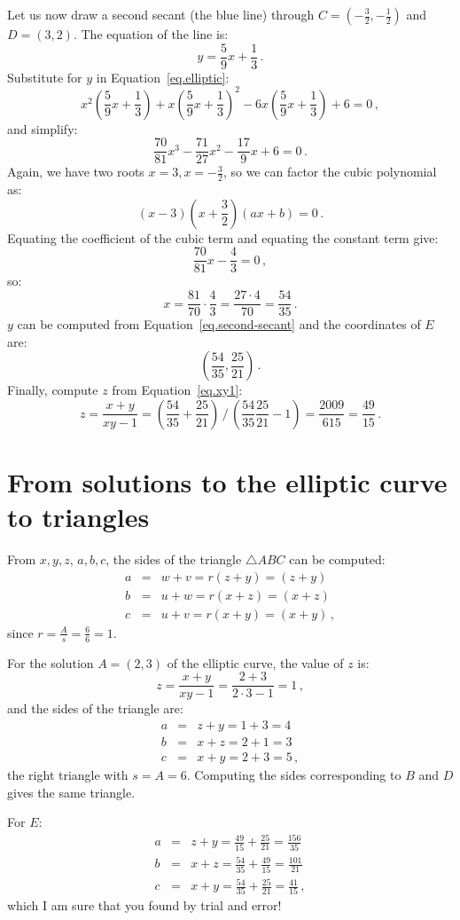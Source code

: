 \documentclass[11pt,a4paper]{article}
\begin{document}
Let us now draw a second secant (the blue line) through $C=(-\frac{3}{2},-\frac{1}{2})$ and $D=(3,2)$. The equation of the line is:
\begin{equation}
y = \frac{5}{9}x + \frac{1}{3}\,.\label{eq.second-secant}
\end{equation}
Substitute for $y$ in Equation~\ref{eq.elliptic}:
\[
x^2\left(\frac{5}{9}x + \frac{1}{3}\right) + x\left(\frac{5}{9}x + \frac{1}{3}\right)^2 -6x\left(\frac{5}{9}x + \frac{1}{3}\right) +6 =0\,,
\]
and simplify:
\[
\frac{70}{81}x^3 - \frac{71}{27}x^2 - \frac{17}{9}x +6 =0\,.
\]
Again, we have two roots $x=3,x=-\frac{3}{2}$, so we can factor the cubic polynomial as:
\[
(x-3)(x+\frac{3}{2})(ax+b)=0\,.
\]
Equating the coefficient of the cubic term and equating the constant term give:
\[
\frac{70}{81}x - \frac{4}{3}=0\,,
\]
so:
\[
x=\frac{81}{70}\cdot \frac{4}{3}= \frac{27\cdot 4}{70} = \frac{54}{35}\,.
\]
$y$ can be computed from Equation~\ref{eq.second-secant} and the coordinates of $E$ are:
\[
\left(\frac{54}{35}, \frac{25}{21}\right)\,.
\]
Finally, compute $z$ from Equation~\ref{eq.xy1}:
\[
z=\frac{x+y}{xy-1}=%
\displaystyle\left(\frac{54}{35} + \frac{25}{21}\right)%
 \, / \,%
\displaystyle\left(\frac{54}{35}\frac{25}{21}-1\right)=%
\frac{2009}{615} = \frac{49}{15}\,.
\]

\section{From solutions to the elliptic curve to triangles}

From $x,y,z$, $a,b,c$, the sides of the triangle $\triangle ABC$ can be computed:
\begin{eqnarray*}
a&=&w+v = r(z+y)=(z+y)\\
b&=&u+w= r(x+z)=(x+z)\\
c&=&u+v=r(x+y)=(x+y)\,,
\end{eqnarray*}
since $\displaystyle r=\frac{A}{s}=\frac{6}{6}=1$.

For the solution $A=(2,3)$ of the elliptic curve, the value of $z$ is:
\[
z=\frac{x+y}{xy-1}=\frac{2+3}{2\cdot 3-1}=1\,,
\]
and the sides of the triangle are:
\begin{eqnarray*}
a &=& z+y = 1+3 = 4\\
b &=& x+z = 2+1=3\\
c &=& x+y = 2+3=5\,,
\end{eqnarray*}
the right triangle with $s=A=6$. Computing the sides corresponding to $B$ and $D$ gives the same triangle.

For $E$:
\begin{eqnarray*}
a &=& z+y = \frac{49}{15} + \frac{25}{21} = \frac{156}{35}\\
b &=& x+z = \frac{54}{35} + \frac{49}{15} = \frac{101}{21}\\
c &=& x+y = \frac{54}{35} + \frac{25}{21}  = \frac{41}{15}\,,
\end{eqnarray*}
which I am sure that you found by trial and error!
\end{document}
